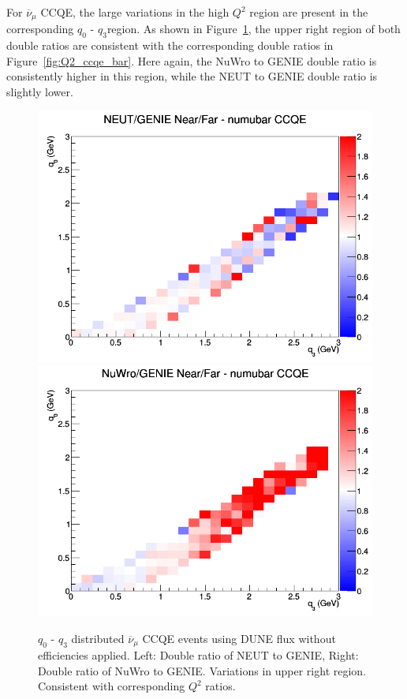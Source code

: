 \documentclass[12pt]{article}
\begin{document}
For $\overline{\nu}_{\mu}$ CCQE, the large variations in the high $Q^2$ region are present in the corresponding $q_0 \textrm{ - } q_3$region. As shown in Figure~\ref{fig:q0q3_numubar_CCQE_no_eff}, the upper right region of both double ratios are consistent with the corresponding double ratios in Figure~\ref{fig:Q2_ccqe_bar}. Here again, the NuWro to GENIE double ratio is consistently higher in this region, while the NEUT to GENIE double ratio is slightly lower.

\begin{figure}[h]
\centering
{}
\includegraphics[width=\linewidth]{q0_q3/nominal/ratios/CCQE_NEUT_GENIE_numubar_NF_q3_q0.png}
\endminipage
{}
\includegraphics[width=\linewidth]{q0_q3/nominal/ratios/CCQE_NuWro_GENIE_numubar_NF_q3_q0.png}
\endminipage
\caption{$q_0 \textrm{ - } q_3$ distributed $\overline{\nu}_{\mu}$ CCQE events using DUNE flux without efficiencies applied. Left: Double ratio of NEUT to GENIE, Right: Double ratio of NuWro to GENIE. Variations in upper right region. Consistent with corresponding $Q^2$ ratios.}
\label{fig:q0q3_numubar_CCQE_no_eff}
\end{figure}
\end{document}
